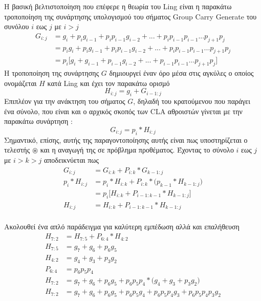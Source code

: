 Η βασική βελτιστοποίηση που επέφερε η θεωρία του Ling είναι η παρακάτω τροποποίηση 
της συνάρτησης υπολογισμού του σήματος Group Carry Generate του συνόλου $i$ εως $j$ με $i > j$
\begin{equation}
\begin{split}
    G_{i:j} &= g_i + p_ig_{i-1} + p_ip_{i-1}g_{i-2} + ... + p_ip_{i-1}p_{i-1}...p_{j+1}p_j\\
            &= p_ig_i + p_ig_{i-1} + p_ip_{i-1}g_{i-2} + ... + p_ip_{i-1}p_{i-1}...p_{j+1}p_j\\
            &= p_i \bigg[ g_i + g_{i-1} + p_{i-1}g_{i-2} + ... + p_{i-1}p_{i-1}...p_{j+1}p_j \bigg]
\end{split}
\end{equation}
Η τροποποίηση της συνάρτησης $G$ δημιουργεί έναν όρο μέσα στις αγκύλες ο οποίος
ονομάζεται $H$ κατά Ling και έχει τον παρακάτω ορισμό 
\begin{equation}
    H_{i:j} = g_i + G_{i-1:j}
\end{equation}
Επιπλέον για την ανάκτηση του σήματος $G$, δηλαδή του κρατούμενου που παράγει ένα σύνολο, 
που είναι και ο αρχικός σκοπός των CLA αθροιστών γίνεται με την παρακάτω συνάρτηση :
\begin{equation}
    G_{i:j} = p_i * H_{i:j}
\end{equation}
Σημαντικό, επίσης, αυτής της παραγοντοποίησης αυτής είναι πως υποστηρίζεται ο τελεστής $\circledast$
και η αναγωγή της σε πρόβλημα προθέματος. Έχοντας το σύνολο $i$ εως $j$ με $i>k>j$ αποδεικνύεται πως
\begin{equation}
\begin{split}
    G_{i:j} &= G_{i:k} + P_{i:k}*G_{k-1:j}\\
    p_i * H_{i:j}  &= p_i * H_{i:k} + P_{i:k}*\big( p_{k-1}*H_{k-1:j}\big)\\
            &= p_i \big[  H_{i:k} + P_{i-1:k-1}*H_{k-1:j}    \big] \\
    H_{i:j}  &= H_{i:k} + P_{i-1:k-1}*H_{k-1:j}
\end{split}
\end{equation}
\\
Ακολουθεί ένα απλό παράδειγμα για καλύτερη εμπέδωση αλλά και επαλήθευση 
\begin{equation*}
\begin{split}
    H_{7:2} &= H_{7:5} + P_{6:4}*H_{4:2} \\
    H_{7:5} &= g_7 + g_6 + p_6g_5 \\
    H_{4:2} &= g_4 + g_3 + p_3g_2 \\
    P_{6:4} &= p_6p_5p_4\\
    H_{7:2} &= g_7 + g_6 + p_6g_5 + p_6p_5p_4*\big(g_4 + g_3 + p_3g_2 \big)\\
    H_{7:2} &= g_7 + g_6 + p_6g_5 + p_6p_5g_4 + p_6p_5p_4g_3 + p_6p_5p_4p_3g_2
\end{split}
\end{equation*}
